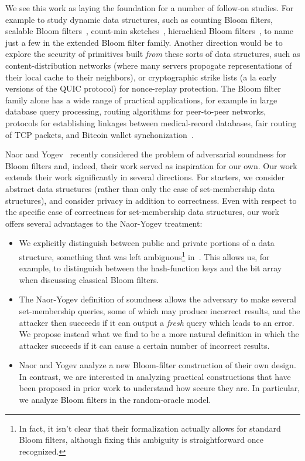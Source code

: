 We see this work as laying the foundation for a number of follow-on studies.  For example to study dynamic data structures, such as counting Bloom filters\cite{fan2000summary}, scalable Bloom filters~\cite{almeida2007scalable}, count-min sketches~\cite{cormode2005improved}, hierachical Bloom filters~\cite{zhu2004hierarchical}, to name just a few in the extended Bloom filter family.  Another direction would be to explore the security of primitives built \emph{from} these sorts of data structures, such as content-distribution networks (where many servers propogate representations of their local cache to their neighbors), or cryptographic strike lists (a la early versions of the QUIC protocol) for nonce-replay protection.  The Bloom filter family alone has a wide range of practical applications, for example in large database query
processing, routing algorithms for peer-to-peer networks, protocols
for establishing linkages between medical-record databases, fair
routing of TCP packets, and Bitcoin wallet synchonization~\cite{schnell2011novel,niedermeyer2014cryptanalysis,gervais2014privacy,nojima2009cryptographically,feng2001stochastic,reynolds2003efficient,byers2002informed,broder2004network}.


 Naor and
Yogev~\cite{naor2015bloom} recently considered the problem of
adversarial soundness for Bloom filters and, indeed,
their work served as inspiration for our own. Our work extends
their work significantly in several directions. For starters, we
consider abstract data structures (rather than only the case of
set-membership data structures), and consider privacy in addition to
correctness. Even with respect to the specific case of correctness for
set-membership data structures, our work offers several advantages
to the Naor-Yogev treatment:
\begin{itemize}
\item We explicitly distinguish between public and private
    portions of a data structure, something that was left
    ambiguous\footnote{In fact, it isn't clear that their formalization actually allows for standard Bloom filters, although fixing this ambiguity is straightforward once recognized.} in~\cite{naor2015bloom}. This allows us, for
    example, to distinguish between the hash-function keys and
    the bit array when discussing classical Bloom filters.
\item The Naor-Yogev definition of soundness allows the
    adversary to make several set-membership queries, some of
    which may produce incorrect results, and the attacker then
    succeeds if it can output a \emph{fresh} query which leads
    to an error. We propose instead what we find to be a more
    natural definition in which the attacker succeeds if it can
    cause a certain number of incorrect results.
\item Naor and Yogev analyze a new Bloom-filter construction of
    their own design. In contrast, we are interested in
    analyzing practical constructions that have been proposed in
    prior work to understand how secure they are. In particular,
    we analyze Bloom filters in the random-oracle model.
\end{itemize}

